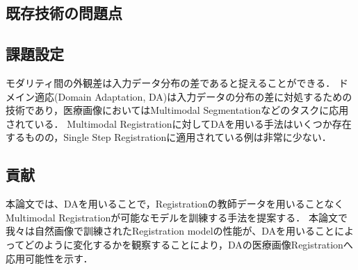 \subsection{既存技術の問題点}

\subsection{課題設定}
    モダリティ間の外観差は入力データ分布の差であると捉えることができる．
    ドメイン適応(Domain Adaptation, DA)は入力データの分布の差に対処するための技術であり，医療画像においてはMultimodal Segmentationなどのタスクに応用されている．
    Multimodal Registrationに対してDAを用いる手法はいくつか存在するものの，Single Step Registrationに適用されている例は非常に少ない．

\subsection{貢献}
    本論文では、DAを用いることで，Registrationの教師データを用いることなくMultimodal Registrationが可能なモデルを訓練する手法を提案する．
    本論文で我々は自然画像で訓練されたRegistration modelの性能が、DAを用いることによってどのように変化するかを観察することにより，DAの医療画像Registrationへ応用可能性を示す．